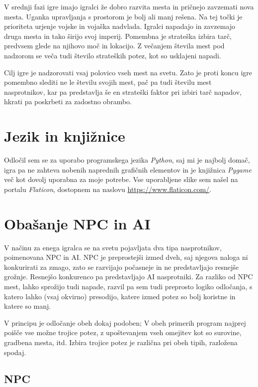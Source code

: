 \documentclass[a4paper, 16pt]{article}
\begin{document}
V srednji fazi igre imajo igralci že dobro razvita mesta in pričnejo zavzemati nova mesta. Uganka upravljanja s prostorom je bolj ali manj rešena. Na tej točki je prioriteta urjenje vojske in vojaška nadvlada.
Igralci napadajo in zavzemajo druga mesta in tako širijo svoj imperij. Pomembna je strateška izbira tarč, predvsem glede na njihovo moč in lokacijo. Z večanjem števila mest pod nadzorom se veča tudi število strateških 
potez, kot so usklajeni napadi. 

Cilj igre je nadzorovati vsaj polovico vseh mest na svetu. Zato je proti koncu igre pomembno slediti ne le številu svojih mest, pač pa tudi številu mest nasprotnikov, kar pa predstavlja še en strateški faktor pri izbiri 
tarč napadov, hkrati pa poskrbeti za zadostno obrambo.

\section{Jezik in knjižnice}

Odločil sem se za uporabo programskega jezika \textit{Python}, saj mi je najbolj domač, igra pa ne zahteva nobenih naprednih grafičnih elementov in je knjižnica 
\textit{Pygame} več kot dovolj uporabna za moje potrebe. Vse uporabljene slike sem našel na portalu \textit{Flaticon}, dostopnem na naslovu \url{https://www.flaticon.com/}.

\section{Obašanje NPC in AI}

V načinu za enega igralca se na svetu pojavljata dva tipa nasprotnikov, poimenovana NPC in AI. NPC je preprostejši izmed dveh, saj njegova naloga ni konkurirati za zmago,
zato se razvijajo počasneje in ne predstavljajo resnejše grožnje. Resnejšo konkurenco pa predstavljajo AI nasprotniki. Za razliko od NPC mest, lahko sprožijo tudi napade, 
razvil pa sem tudi preprosto logiko odločanja, s katero lahko (vsaj okvirno) presodijo, katere izmed potez so bolj koristne in katere so manj.

V principu je odločanje obeh dokaj podoben; V obeh primerih program najprej poišče vse možne trojice potez, z upoštevanjem 
vseh omejitev kot so surovine, gradbena mesta, itd. Izbira trojice potez je različna pri obeh tipih, razložena spodaj. 

\subsection{NPC}
\end{document}
